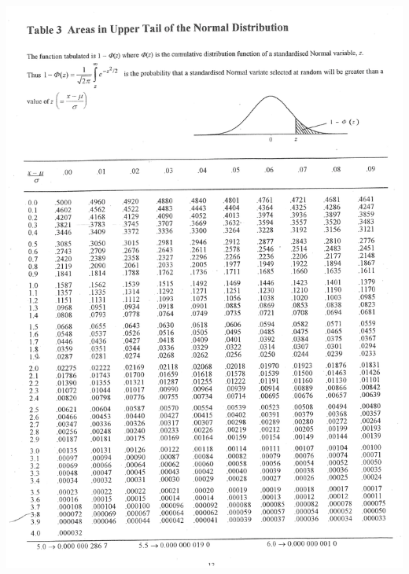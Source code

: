 \documentclass[12pt]{article}
\begin{document}
\begin{adjustwidth}{-1cm}{0cm}
\includegraphics[width=1.1\textwidth, trim = 1cm 1cm 1cm 1cm, clip]{mdnorm}
\end{adjustwidth}

\newpage
\end{document}
